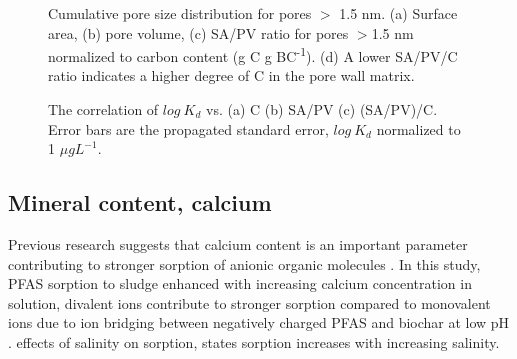 \begin{figure}[!ht]
{}
\caption{Cumulative pore size distribution for pores $>$ 1.5 nm. (a) Surface area, (b) pore volume, (c) SA/PV ratio for pores $>$1.5 nm normalized to carbon content (g C g BC\textsuperscript{-1}). (d) A lower SA/PV/C ratio indicates a higher degree of C in the pore wall matrix.}
\label{fig:PZD_large}
\end{figure}

\begin{figure}[!ht]
\hfill
{}
\hfill
{}
\caption{The correlation of $log~K_d$ vs. (a) C (b) SA/PV (c) (SA/PV)/C. Error bars are the propagated standard error, $log~K_d$ normalized to 1 $\mu g L^{-1}$.}
\label{fig:Kd_SAPV_C}
\end{figure}

\subsection{Mineral content, calcium}
Previous research suggests that calcium content is an important parameter contributing to stronger sorption of anionic organic molecules \citep{higgins2006sorption,sigmund2022sorption}. In this study, PFAS sorption to sludge enhanced with increasing calcium concentration in solution, divalent ions contribute to stronger sorption compared to monovalent ions due to ion bridging between negatively charged PFAS and biochar at low pH \citep{zhang2013sorption,arvaniti2014sorption,arvaniti2015review}. 
\citep{yin2022insights} effects of salinity on sorption, states sorption increases with increasing salinity. 

